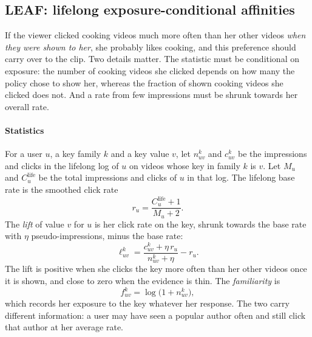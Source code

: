 \documentclass[preprint,12pt,authoryear]{elsarticle}
\begin{document}
\subsection{LEAF: lifelong exposure-conditional affinities}
\label{sec:method-leaf}

If the viewer clicked cooking videos much more often than her other videos \emph{when they were shown to her}, she probably likes
cooking, and this preference should carry over to the clip. Two details matter. The statistic must be conditional on exposure: the
number of cooking videos she clicked depends on how many the policy chose to show her, whereas the fraction of shown cooking videos she
clicked does not. And a rate from few impressions must be shrunk towards her overall rate.

\paragraph{Statistics} For a user $u$, a key family $k$ and a key value $v$, let $n^k_{uv}$ and $c^k_{uv}$ be the impressions and clicks
in the lifelong log of $u$ on videos whose key in family $k$ is $v$. Let $M_u$ and $C_u^{\mathrm{life}}$ be the total impressions and
clicks of $u$ in that log. The lifelong base rate is the smoothed click rate
\begin{equation}
  r_u=\frac{C_u^{\mathrm{life}}+1}{M_u+2}.
  \label{eq:base-rate}
\end{equation}
The \emph{lift} of value $v$ for $u$ is her click rate on the key, shrunk towards the base rate with $\eta$ pseudo-impressions, minus
the base rate:
\begin{equation}
  \ell^k_{uv}=\frac{c^k_{uv}+\eta\,r_u}{n^k_{uv}+\eta}-r_u .
  \label{eq:lift}
\end{equation}
The lift is positive when she clicks the key more often than her other videos once it is shown, and close to zero when the evidence is
thin. The \emph{familiarity} is
\begin{equation}
  f^k_{uv}=\log\bigl(1+n^k_{uv}\bigr),
  \label{eq:familiarity}
\end{equation}
which records her exposure to the key whatever her response. The two carry different information: a user may have seen a popular author
often and still click that author at her average rate.
\end{document}
